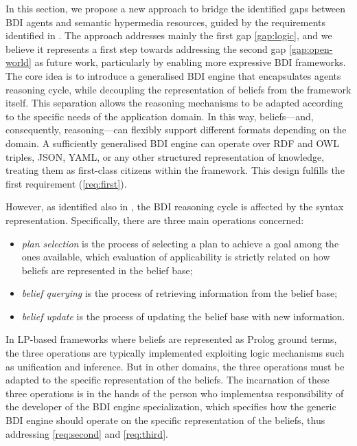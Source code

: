 \documentclass[
]{ceurart}
\begin{document}
In this section,
we propose a new approach to bridge the identified gaps between \ac{BDI} agents and semantic hypermedia resources,
guided by the requirements identified in .
%
The approach addresses mainly the first gap \ref{gap:logic}, 
and we believe it represents a first step towards addressing the second gap \ref{gap:open-world} as future work,
particularly by enabling more expressive \ac{BDI} frameworks.
%
The core idea is to introduce a generalised \ac{BDI} engine that encapsulates agents reasoning cycle, 
while decoupling the representation of beliefs from the framework itself. 
%
This separation allows the reasoning mechanisms to be adapted according to the specific needs of the application domain.
%
In this way, beliefs---and, consequently, reasoning---can flexibly support different formats depending on the domain. 
%
A sufficiently generalised \ac{BDI} engine can operate over \ac{RDF} and \ac{OWL} triples, JSON, YAML, or any other structured representation of knowledge, treating them as first-class citizens within the framework. 
%
This design fulfills the first requirement (\ref{req:first}).

However,
as identified also in \cite{DBLP:conf/dalt/MoreiraVBH05}, 
the \ac{BDI} reasoning cycle is affected by the syntax representation.
%
Specifically,
there are three main operations concerned:
\begin{itemize} 
  \item \emph{plan selection} is the process of selecting a plan to achieve a goal among the ones available, 
  which evaluation of applicability is strictly related on how beliefs are represented in the belief base;
  \item \emph{belief querying} is the process of retrieving information from the belief base;
  \item \emph{belief update} is the process of updating the belief base with new information.
\end{itemize}
%
In \ac{LP}-based frameworks where beliefs are represented as Prolog ground terms, 
the three operations are typically implemented exploiting logic mechanisms such as unification and inference.
%
But in other domains,
the three operations must be adapted to the specific representation of the beliefs.
%
The incarnation of these three operations is in the hands of the person who implementsa responsibility of the developer of the \ac{BDI} engine specialization,
which specifies how the generic \ac{BDI} engine should operate on the specific representation of the beliefs,
thus addressing \ref{req:second} and \ref{req:third}. 
\end{document}
